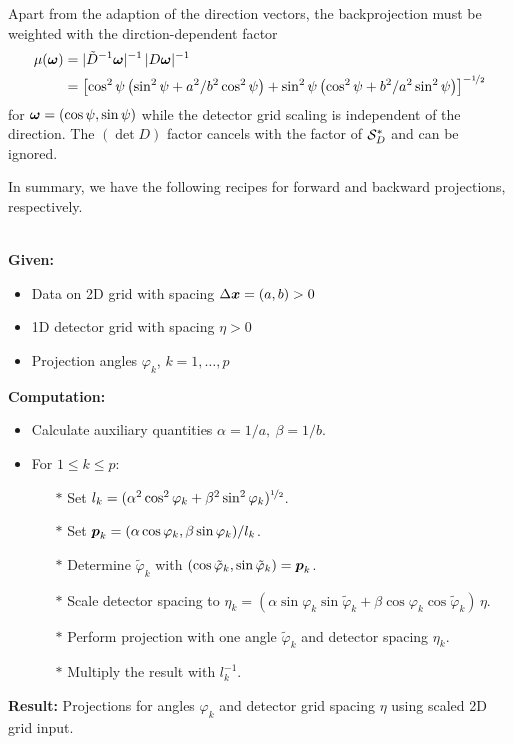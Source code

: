 \documentclass{amsart}
\renewcommand*{\phi}{\varphi}
\begin{document}
%
Apart from the adaption of the direction vectors, the backprojection must be weighted with the dirction-dependent factor
%
\begin{align*}
 \mu({\boldsymbol{\omega}}) 
 &= |\tilde D^{-1} {\boldsymbol{\omega}}|^{-1}\, |D {\boldsymbol{\omega}}|^{-1} \\
 &= \left[\cos^2\psi \left(\sin^2\psi + a^2/b^2 \cos^2\psi\right) + \sin^2\psi \left(\cos^2\psi + b^2/a^2 
 \sin^2\psi\right)\right]^{-{\nicefrac{1}{2}}}
\end{align*}
%
for ${\boldsymbol{\omega}} = (\cos\psi, \sin\psi)$ while the detector grid scaling is independent of the direction. The $(\det D)$ factor cancels with 
the factor of ${\mathcal{S}}_D^*$ and can be ignored.

In summary, we have the following recipes for forward and backward projections, respectively.

\begin{algorithm}~\\[2ex]
 \textbf{Given:}
 \begin{itemize}
  \item Data on 2D grid with spacing $\Delta{\boldsymbol{x}} = (a, b) > 0$
  \item 1D detector grid with spacing $\eta > 0$
  \item Projection angles $\phi_k$, $k = 1, \ldots, p$
 \end{itemize}
 \vspace*{2ex}
 \textbf{Computation:}
 \begin{itemize}
  \item Calculate auxiliary quantities $\alpha = 1 / a,\ \beta = 1 / b$.
  \item For $1 \leq k \leq p$:
  \begin{itemize}
   \item[$\ast$] Set $l_k = (\alpha^2 \cos^2\phi_k + \beta^2 \sin^2\phi_k)^{\nfhalf}$.
   \item[$\ast$] Set $\Bp_k = (\alpha \cos\phi_k, \beta \sin\phi_k) / l_k$.
   \item[$\ast$] Determine $\tilde\phi_k$ with $(\cos\tilde\phi_k, \sin\tilde\phi_k) = \Bp_k$.
   \item[$\ast$] Scale detector spacing to $\eta_k = (\alpha \sin\phi_k \sin\tilde\phi_k + \beta \cos\phi_k \cos\tilde\phi_k)\, \eta$.
   \item[$\ast$] Perform projection with one angle $\tilde\phi_k$ and detector spacing $\eta_k$.
   \item[$\ast$] Multiply the result with $l_k^{-1}$.
  \end{itemize}
 \end{itemize}
 \vspace*{2ex}
 \textbf{Result:} Projections for angles $\phi_k$ and detector grid spacing $\eta$ using scaled 2D grid input.
\end{algorithm}
\end{document}
